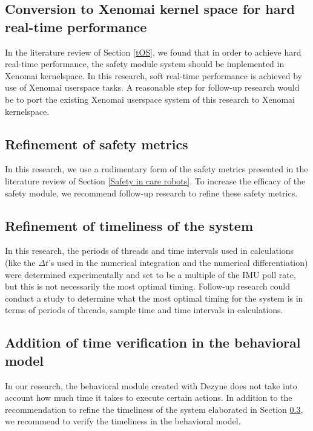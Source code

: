 \documentclass[12pt]{scrreprt}
\begin{document}
\subsection{Conversion to Xenomai kernel space for hard real-time performance}
In the literature review of Section \ref{tOS}, we found that in order to achieve hard real-time performance, the safety module system should be implemented in Xenomai kernelspace. In this research, soft real-time performance is achieved by use of Xenomai userspace tasks. A reasonable step for follow-up research would be to port the existing Xenomai userspace system of this research to Xenomai kernelspace.

\subsection{Refinement of safety metrics}
\label{Refinement of safety metrics}
In this research, we use a rudimentary form of the safety metrics presented in the literature review of Section \ref{Safety in care robots}. To increase the efficacy of the safety module, we recommend follow-up research to refine these safety metrics.

\subsection{Refinement of timeliness of the system}
\label{Refinement of timeliness of the system and scheduling}
In this research, the periods of threads and time intervals used in calculations (like the $\Delta t$'s used in the numerical integration and the numerical differentiation) were determined experimentally and set to be a multiple of the IMU poll rate, but this is not necessarily the most optimal timing. Follow-up research could conduct a study to determine what the most optimal timing for the system is in terms of periods of threads, sample time and time intervals in calculations.

\subsection{Addition of time verification in the behavioral model}
\label{Addition of time verification in the behavioral model}
In our research, the behavioral module created with Dezyne does not take into account how much time it takes to execute certain actions. In addition to the recommendation to refine the timeliness of the system elaborated in Section \ref{Refinement of timeliness of the system and scheduling}, we recommend to verify the timeliness in the behavioral model.
\end{document}
